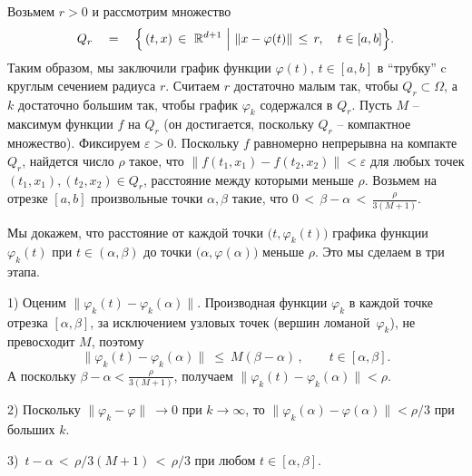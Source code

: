 \documentclass[12pt,a4paper]{article}
\newcommand{\re}{{\mathbb R}}
\begin{document}
 Возьмем $r> 0$
и рассмотрим множество 
$$
Q_r \quad = \quad \Bigl\{\, (t, x) \, \in \ \re^{d+1} \ \Bigl| \ 
\|x - \varphi (t)\| \, \le \, r,\quad t \in [a,b]\Bigr\}.
$$
Таким образом, мы заключили график функции $\varphi(t), \, t \in [a, b]$ в ``трубку'' c круглым сечением 
радиуса  $r$. 
Считаем $r$ достаточно малым так, чтобы $Q_r \subset \Omega$, а $k$ достаточно большим так, чтобы
график $\varphi_k$ содержался в $Q_r$. Пусть $M$ -- максимум функции $f$ на  $Q_r$
(он достигается, поскольку $Q_r$ -- компактное множество). Фиксируем $\varepsilon > 0$. Поскольку $f$ равномерно непрерывна
на компакте $Q_r$, найдется число $\rho$ такое, что $\|f(t_1, x_1) - f(t_2, x_2)\| < \varepsilon$
для любых точек $(t_1, x_1), (t_2, x_2) \in Q_r$, расстояние между которыми меньше $\rho$.
Возьмем на отрезке $[a, b]$ произвольные точки $\alpha,  \beta$ такие, 
что $ 0 \, < \, \beta - \alpha \, < \, \frac{\rho}{3(M+1)}$.

 Мы докажем, что 
расстояние от каждой точки $\bigl(t , \varphi_k (t) \bigr)$ графика функции $\varphi_k(t)$ при $t \in (\alpha, \beta)$
до точки $\bigl(\alpha , \varphi (\alpha) \bigr)$ меньше $\rho$.  Это мы сделаем в три этапа. 
\smallskip 

1) Оценим $\|\varphi_k(t) - \varphi_k(\alpha)\|$. Производная функции $\varphi_k$
в каждой точке отрезка $[\alpha, \beta]$, за исключением узловых точек (вершин ломаной~$\varphi_k$), не превосходит $M$, поэтому
$$
\|\varphi_k(t) - \varphi_k(\alpha)\| \ \le \ M (\beta - \alpha)\, , \qquad t \in [\alpha, \beta]. 
$$
А поскольку $\beta - \alpha < \frac{\rho}{3(M+1)}$, получаем $\|\varphi_k(t) - \varphi_k(\alpha)\| < \rho$. 
\smallskip 

2) Поскольку $\|\varphi_k - \varphi\|\ \to 0$ при $k \to \infty$, то  
 $\|\varphi_k(\alpha) - \varphi(\alpha)\| < \rho/3$ при больших $k$. 
 \smallskip 
 
 3) $\, t - \alpha \, < \, \rho/3(M+1) \, < \, \rho/3$ при любом $t \in [\alpha, \beta]$. 
 \smallskip 
 
\end{document}
